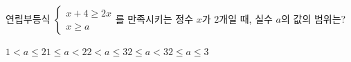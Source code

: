 연립부등식 $\begin{cases} x+4\ge 2x \\ x\ge a \end{cases}$를 만족시키는 정수 $x$가 $2$개일 때, 실수 $a$의 값의 범위는?
\begin{choices32}{$1<a\le 2$}{$1\le a<2$}{$2<a\le 3$}{$2\le a<3$}{$2\le a\le 3$}\end{choices32}
